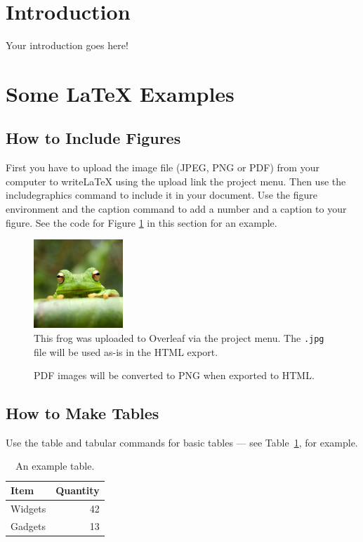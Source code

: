 \documentclass[graybox]{svmult}
\begin{document}
\section{Introduction}

Your introduction goes here! 

\section{Some \LaTeX{} Examples}
\label{sec:examples}

\subsection{How to Include Figures}

First you have to upload the image file (JPEG, PNG or PDF) from your computer to writeLaTeX using the upload link the project menu. Then use the includegraphics command to include it in your document. Use the figure environment and the caption command to add a number and a caption to your figure. See the code for Figure \ref{fig:frog} in this section for an example.

\begin{figure}
\centering
\includegraphics[width=0.3\textwidth]{frog}
\caption{\label{fig:frog}This frog was uploaded to Overleaf via the project menu. The \texttt{.jpg} file will be used as-is in the HTML export.}
\end{figure}

\begin{figure}
\centering
\caption{PDF images will be converted to PNG when exported to HTML.}
\end{figure}

\subsection{How to Make Tables}

Use the table and tabular commands for basic tables --- see Table~\ref{tab:widgets}, for example.

\begin{table}
\centering
\begin{tabular}{l|r}
Item & Quantity \\\hline
Widgets & 42 \\
Gadgets & 13
\end{tabular}
\caption{\label{tab:widgets}An example table.}
\end{table}
\end{document}
